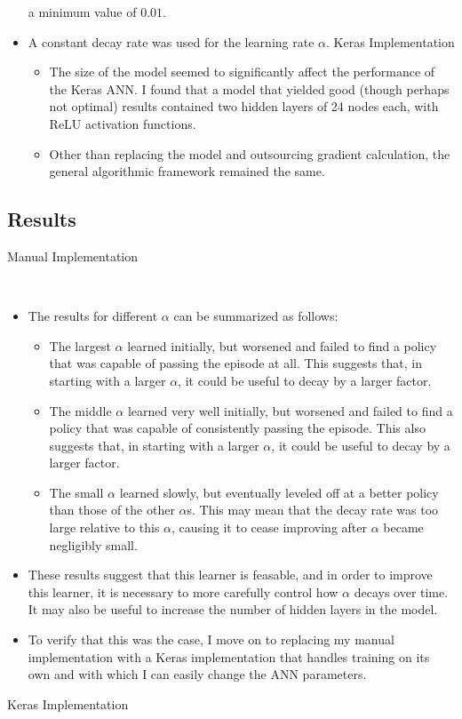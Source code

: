 \documentclass[a4paper]{article}
\begin{document}
\begin{itemize}
        a minimum value of $0.01$.
    \item A constant decay rate was used for the learning rate $\alpha$.
Keras Implementation
\begin{itemize}
    \item The size of the model seemed to significantly affect the performance
        of the Keras ANN. I found that a model that yielded good (though
        perhaps not optimal) results contained two hidden layers of 24 nodes
        each, with ReLU activation functions.
    \item Other than replacing the model and outsourcing gradient calculation,
        the general algorithmic framework remained the same.
\end{itemize}
\end{itemize}
\subsection*{Results}
Manual Implementation

\begin{centering}
    \scalebox{0.6}{} \\
\end{centering}
\begin{itemize}
    \item The results for different $\alpha$ can be summarized as follows:
    \begin{itemize}
        \item The largest $\alpha$ learned initially, but worsened and
            failed to find a policy that was capable of passing the episode at
            all. This suggests that, in starting with a larger $\alpha$, it
            could be useful to decay by a larger factor.
        \item The middle $\alpha$ learned very well initially, but 
            worsened and failed to find a policy that was capable of
            consistently passing the episode.  This also suggests that, in
            starting with a larger $\alpha$, it could be useful to decay by a
            larger factor.
        \item The small $\alpha$ learned slowly, but eventually leveled off at
            a better policy than those of the other $\alpha$s. This may mean
            that the decay rate was too large relative to this $\alpha$, causing
            it to cease improving after $\alpha$ became negligibly small.
    \end{itemize}
    \item These results suggest that this learner is feasable, and in order to
        improve this learner, it is necessary to more carefully control how
        $\alpha$ decays over time. It may also be useful to increase the number
        of hidden layers in the model. 
    \item To verify that this was the case,
        I move on to replacing my manual implementation with a Keras 
        implementation that handles training on its own and with which I can
        easily change the ANN parameters.
\end{itemize}
Keras Implementation
\end{document}
